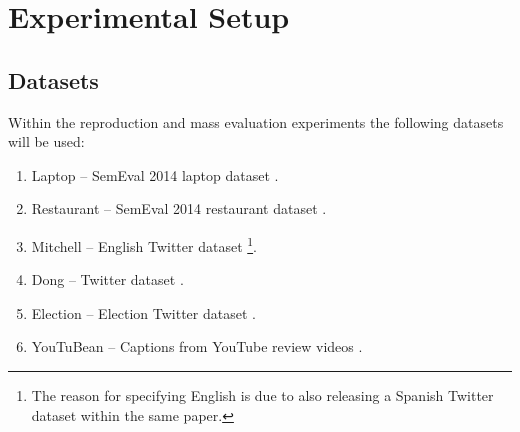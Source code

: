 
\FloatBarrier
\section{Experimental Setup}
\label{section:repro_experimental_setup}
\subsection{Datasets}
\label{section:repro_experimental_setup_datasets_new}
Within the reproduction and mass evaluation experiments the following datasets will be used: 

\begin{enumerate}
    \item Laptop -- SemEval 2014 laptop dataset \citep{pontiki-etal-2014-semeval}.
    \item Restaurant -- SemEval 2014 restaurant dataset \citep{pontiki-etal-2014-semeval}.
    \item Mitchell -- English Twitter dataset \citep{mitchell-etal-2013-open}\footnote{The reason for specifying English is due to \citet{mitchell-etal-2013-open} also releasing a Spanish Twitter dataset within the same paper.}.
    \item Dong -- Twitter dataset \citep{dong-etal-2014-adaptive}.
    \item Election -- Election Twitter dataset \citep{wang-etal-2017-tdparse}.
    \item YouTuBean -- Captions from YouTube review videos \citep{marrese-taylor-etal-2017-mining}.
\end{enumerate}


